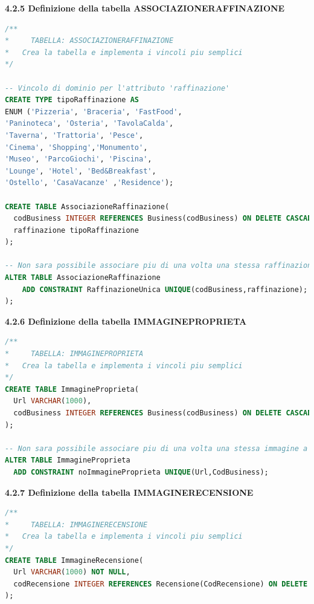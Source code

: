 \documentclass[a4paper,12pt]{article}
\begin{document}
\newpage\null{}\setcounter{page}{17}
\vspace{-2cm}
{\flushleft \bf 4.2.5  Definizione della tabella ASSOCIAZIONERAFFINAZIONE}
\begin{lstlisting}[language=SQL]
/**
*	  TABELLA: ASSOCIAZIONERAFFINAZIONE
*   Crea la tabella e implementa i vincoli piu semplici
*/

-- Vincolo di dominio per l'attributo 'raffinazione'
CREATE TYPE tipoRaffinazione AS 
ENUM ('Pizzeria', 'Braceria', 'FastFood',
'Paninoteca', 'Osteria', 'TavolaCalda',
'Taverna', 'Trattoria', 'Pesce',
'Cinema', 'Shopping','Monumento',
'Museo', 'ParcoGiochi', 'Piscina',
'Lounge', 'Hotel', 'Bed&Breakfast',
'Ostello', 'CasaVacanze' ,'Residence');

CREATE TABLE AssociazioneRaffinazione(
  codBusiness INTEGER REFERENCES Business(codBusiness) ON DELETE CASCADE,
  raffinazione tipoRaffinazione
);

-- Non sara possibile associare piu di una volta una stessa raffinazione a un business
ALTER TABLE AssociazioneRaffinazione
	ADD CONSTRAINT RaffinazioneUnica UNIQUE(codBusiness,raffinazione);
);
\end{lstlisting}

\vspace*{+1cm}

{\flushleft \bf 4.2.6  Definizione della tabella IMMAGINEPROPRIETA}
\begin{lstlisting}[language=SQL]
/**
*	  TABELLA: IMMAGINEPROPRIETA
*   Crea la tabella e implementa i vincoli piu semplici
*/
CREATE TABLE ImmagineProprieta(
  Url VARCHAR(1000),
  codBusiness INTEGER REFERENCES Business(codBusiness) ON DELETE CASCADE
);

-- Non sara possibile associare piu di una volta una stessa immagine a un business
ALTER TABLE ImmagineProprieta
  ADD CONSTRAINT noImmagineProprieta UNIQUE(Url,CodBusiness);
\end{lstlisting}

\vspace*{+1cm}

{\flushleft \bf 4.2.7  Definizione della tabella IMMAGINERECENSIONE}
\begin{lstlisting}[language=SQL]
/**
*	  TABELLA: IMMAGINERECENSIONE
*   Crea la tabella e implementa i vincoli piu semplici
*/
CREATE TABLE ImmagineRecensione(
  Url VARCHAR(1000) NOT NULL,
  codRecensione INTEGER REFERENCES Recensione(CodRecensione) ON DELETE CASCADE
);
\end{lstlisting}
\newpage
\end{document}
